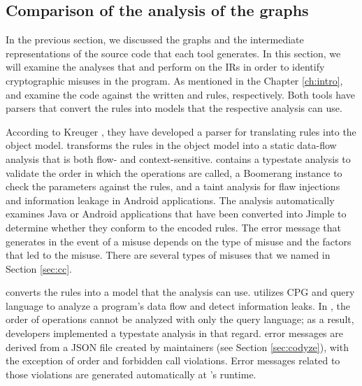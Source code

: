 \subsection{Comparison of the analysis of the graphs}
\label{sec:comanalysis}
In the previous section, we discussed the graphs and the intermediate representations of the source code that each tool generates. In this section, we will examine the analyses that \codyze{} and \cognicryptsast{} perform on the IRs in order to identify cryptographic misuses in the program. As mentioned in the Chapter \ref{ch:intro}, \codyze{} and \cognicryptsast{} examine the code against the written \MARK{} and \crysl{} rules, respectively. Both tools have parsers that convert the rules into models that the respective analysis can use.

According to Kreuger \cite{stefanphd}, they have developed a parser for translating \crysl{} rules into the \crysl{} object model. \cognicryptsast{} transforms the rules in the \crysl{} object model into a static data-flow analysis that is both flow- and context-sensitive. \cognicryptsast{} contains a typestate analysis to validate the order in which the operations are called, a Boomerang instance to check the parameters against the \crysl{} rules, and a taint analysis for flaw injections and information leakage in Android applications. The analysis automatically examines Java or Android applications that have been converted into Jimple to determine whether they conform to the encoded \crysl{} rules. The error message that \cognicryptsast{} generates in the event of a misuse depends on the type of misuse and the factors that led to the misuse. There are several types of misuses that we named in Section \ref{sec:cc}. 

\codyze{} converts the \MARK{} rules into a \MARK{} model that the analysis can use. \codyze{} utilizes CPG and query language to analyze a program's data flow and detect information leaks. In \codyze, the order of operations cannot be analyzed with only the query language; as a result, \codyze{} developers implemented a typestate analysis in that regard. \codyze{} error messages are derived from a JSON file created by \codyze{} maintainers (see Section \ref{sec:codyze}), with the exception of order and forbidden call violations. Error messages related to those violations are generated automatically at \codyze's runtime.


